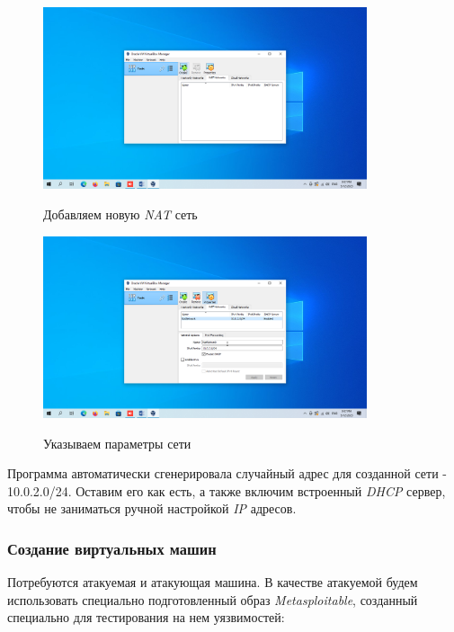 \documentclass[a4paper]{article}
\begin{document}
  \begin{figure}[H]
    \centering
    \includegraphics[width=0.85\textwidth]{04_0002}
    \label{img:2}
    \caption{Добавляем новую \textit{NAT} сеть}
  \end{figure}

  \begin{figure}[H]
    \centering
    \includegraphics[width=0.85\textwidth]{04_0003}
    \label{img:3}
    \caption{Указываем параметры сети}
  \end{figure}

  Программа автоматически сгенерировала случайный адрес для созданной сети - 10.0.2.0/24.
  Оставим его как есть, а также включим встроенный \textit{DHCP} сервер, чтобы не заниматься
  ручной настройкой \textit{IP} адресов.

  \subsubsection{Создание виртуальных машин}

  Потребуются атакуемая и атакующая машина. В качестве атакуемой будем использовать
  специально подготовленный образ \textit{Metasploitable}, созданный специально для
  тестирования на нем уязвимостей:
\end{document}
